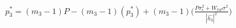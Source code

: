 \documentclass[preview]{standalone}
\begin{document}
\begin{align*}
p_3^\ast = \left(m_3 - 1\right) P - \left(m_3 - 1\right) \left(p_3^\ast\right) + \left(m_3 - 1\right) \bigg( \frac{P \sigma_\epsilon^2 + W_{tot} \sigma^2 }{ \left| \hat{h_3} \right| ^2 } \bigg)
\end{align*}
\end{document}
